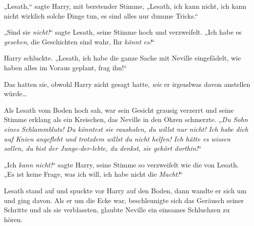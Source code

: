 „Lesath,“ sagte Harry, mit berstender Stimme, „Lesath, ich kann nicht, ich kann nicht wirklich solche Dinge tun, es sind alles nur dumme Tricks.“

„Sind sie \emph{nicht!}“ sagte Lesath, seine Stimme hoch und verzweifelt. „Ich habe es \emph{gesehen}, die Geschichten sind wahr, Ihr \emph{könnt es!}“

Harry schluckte. „Lesath, ich habe die ganze Sache mit Neville eingefädelt, wie haben alles im Voraus geplant, frag ihn!“

Das hatten sie, obwohl Harry nicht gesagt hatte, \emph{wie} er irgendwas davon anstellen würde…

Als Lesath vom Boden hoch sah, war sein Gesicht grausig verzerrt und seine Stimme erklang als ein Kreischen, das Neville in den Ohren schmerzte. „\emph{Du Sohn eines Schlammbluts! Du könntest sie rausholen, du willst nur nicht! Ich habe dich auf Knien angefleht und trotzdem willst du nicht helfen! Ich hätte es wissen sollen, du bist der Junge-der-lebte, du denkst, sie gehört dorthin!}“

„Ich \emph{kann nicht!}“ sagte Harry, seine Stimme so verzweifelt wie die von Lesath. „Es ist keine Frage, was ich will, ich habe nicht die \emph{Macht!}“

Lesath stand auf und spuckte vor Harry auf den Boden, dann wandte er sich um und ging davon. Als er um die Ecke war, beschleunigte sich das Geräusch seiner Schritte und als sie verblassten, glaubte Neville ein einsames Schluchzen zu hören.

